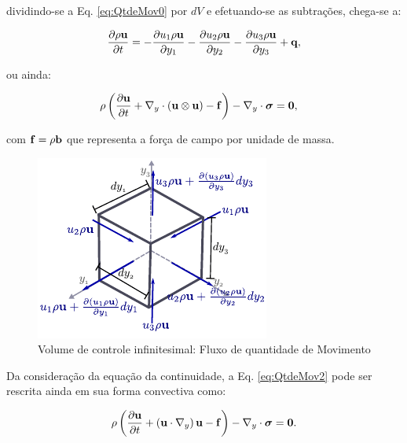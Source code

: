 \documentclass[tese_patricia]{subfiles}%
\begin{document}
\noindent dividindo-se a Eq. \ref{eq:QtdeMov0} por $dV$ e efetuando-se as subtrações, chega-se a:

\begin{align}
		\frac{\partial \rho \mathbf{u}}{\partial t} = 
		-\frac{\partial u_1 \rho \mathbf{u}}{\partial y_1} 
		-\frac{\partial u_2 \rho \mathbf{u}}{\partial y_2}  
		-\frac{\partial u_3 \rho \mathbf{u}}{\partial y_3} + \mathbf{q},
		\label{eq:QtdeMov1} 
\end{align}

ou ainda:

\begin{align}
	\rho\left(\frac{\partial\mathbf{u}}{\partial t} + \nabla_y \cdot \left(\mathbf{u}\otimes\mathbf{u}\right) - \mathbf{f} \right) - \nabla_y \cdot \boldsymbol{\sigma}  &= \mathbf{0}, \label{eq:QtdeMov2} 
\end{align}

\noindent com $\mathbf{f} = \rho \mathbf{b}$ que representa a força de campo por unidade de massa.

\begin{figure}[htb!]
	\centering 
	\includegraphics[scale=1.5,trim=0cm 0.0cm 0cm 0.0cm, clip=true]{Imagens/Cap2/conserQtdeMov.pdf}	
	\caption{Volume de controle infinitesimal: Fluxo de quantidade de Movimento}
	\label{fig:VolInfiQtdeMov}
\end{figure}

Da consideração da equação da continuidade, a Eq. \ref{eq:QtdeMov2} pode ser rescrita ainda em sua forma convectiva como:

\begin{align}
	\rho\left(\frac{\partial\mathbf{u}}{\partial t} + \left( \mathbf{u} \cdot \nabla_y \right)  \mathbf{u}  - \mathbf{f} \right) - \nabla_y \cdot \boldsymbol{\sigma} = \mathbf{0}. \label{eq:Navier-Stokes} 
\end{align}
\end{document}
